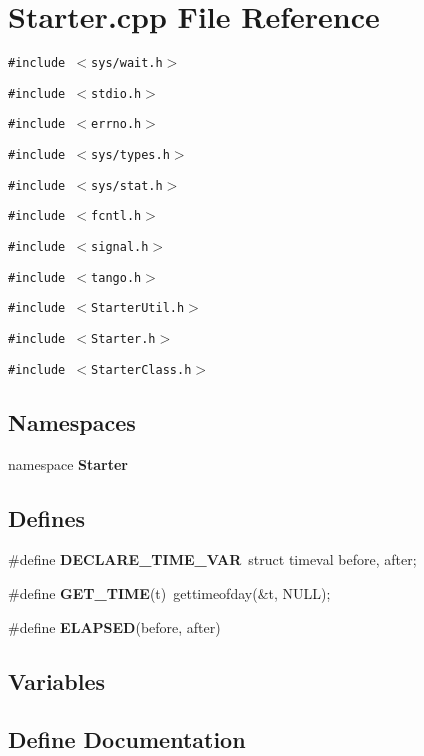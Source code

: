 \section{Starter.cpp File Reference}
\label{Starter_8cpp}
{\tt \#include $<$sys/wait.h$>$}\par
{\tt \#include $<$stdio.h$>$}\par
{\tt \#include $<$errno.h$>$}\par
{\tt \#include $<$sys/types.h$>$}\par
{\tt \#include $<$sys/stat.h$>$}\par
{\tt \#include $<$fcntl.h$>$}\par
{\tt \#include $<$signal.h$>$}\par
{\tt \#include $<$tango.h$>$}\par
{\tt \#include $<$Starter\-Util.h$>$}\par
{\tt \#include $<$Starter.h$>$}\par
{\tt \#include $<$Starter\-Class.h$>$}\par
\subsection*{Namespaces}
\begin{CompactItemize}
\item 
namespace {\bf Starter}
\end{CompactItemize}
\subsection*{Defines}
\begin{CompactItemize}
\item 
\#define {\bf DECLARE\_\-TIME\_\-VAR}\ struct timeval	before, after;
\item 
\#define {\bf GET\_\-TIME}(t)\ gettimeofday(\&t, NULL);
\item 
\#define {\bf ELAPSED}(before, after)
\end{CompactItemize}
\subsection*{Variables}


\subsection{Define Documentation}
